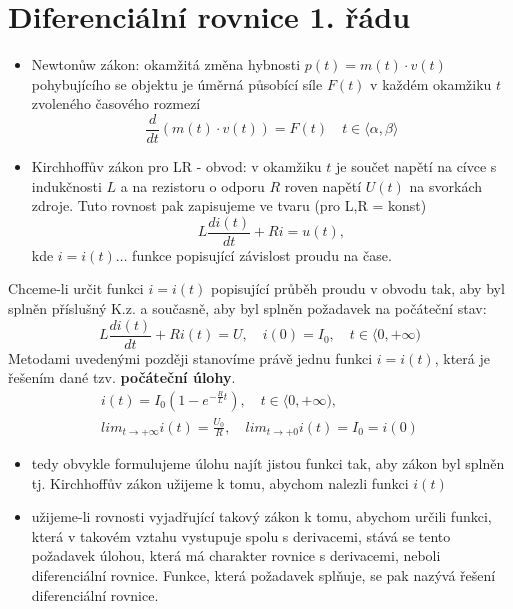     
      
  \section{Diferenciální rovnice 1. řádu}

    \begin{itemize}
   	  \item Newtonůw zákon: okamžitá změna hybnosti $p(t) = m(t)\cdot v(t)$ pohybujícího se
            objektu je úměrná působící síle $F(t)$ v každém okamžiku $t$ zvoleného časového rozmezí
            $$\frac{d}{dt}\left(m(t)\cdot v(t)\right) = F(t)\quad t\in\langle\alpha, \beta\rangle$$
      \item Kirchhoffův zákon pro LR - obvod: v okamžiku $t$ je součet napětí na cívce s indukčnosti
            $L$ a na rezistoru o odporu $R$ roven napětí $U(t)$ na svorkách zdroje. Tuto rovnost pak
            zapisujeme ve tvaru (pro L,R = konst)
            \begin{equation}
              L\frac{di(t)}{dt}+Ri=u(t), 
            \end{equation}
            kde $i=i(t)\ldots$ funkce popisující závislost proudu na čase.
    \end{itemize}
    
    Chceme-li určit funkci $i=i(t)$ popisující průběh proudu v obvodu tak, aby byl splněn příslušný
    K.z. a současně, aby byl splněn požadavek na počáteční stav:
    \begin{equation}
        L\frac{di(t)}{dt}+Ri(t)=U,\quad i(0)=I_0,\quad t\in\langle 0,+\infty)
    \end{equation}
    Metodami uvedenými později stanovíme právě jednu funkci $i=i(t)$, která je řešením dané tzv.
    \textbf{počáteční úlohy}.
    \begin{equation}
      \begin{array}{c}
         i(t)=I_0\left(1-e^{-\frac{R}{L}t}\right),\quad t\in\langle 0,+\infty), \\
         lim_{t\rightarrow +\infty}i(t)=\frac{U_0}{R},\quad lim_{t\rightarrow +0}i(t)=I_0=i(0)
      \end{array}
    \end{equation}
    \begin{itemize}
      \item tedy obvykle formulujeme úlohu najít jistou funkci tak, aby zákon byl splněn tj.
            Kirchhoffův zákon užijeme k tomu, abychom nalezli funkci $i(t)$
      \item užijeme-li rovnosti vyjadřující takový zákon k tomu, abychom určili funkci, která v
            takovém vztahu vystupuje spolu s derivacemi, stává se tento požadavek úlohou, která má
            charakter rovnice s derivacemi, neboli diferenciální rovnice. Funkce, která požadavek
            splňuje, se pak nazývá řešení diferenciální rovnice.
    \end{itemize}
    
